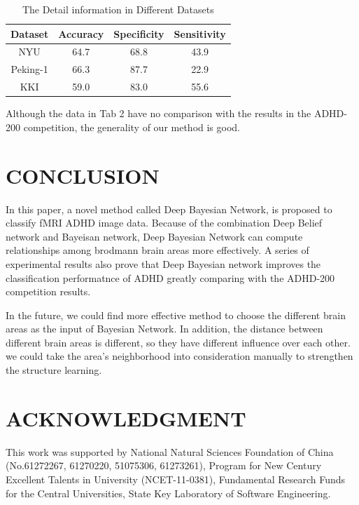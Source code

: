 \documentclass[10pt,twocolumn,letterpaper]{article}
\begin{document}
\begin{table}[h]
\label{tab:2}
\caption{The Detail information in Different Datasets}
\begin{center}
\begin{tabular}{cccc}
\hline

Dataset  	&   Accuracy  	&	Specificity  &	Sensitivity \\
\hline
NYU			&  64.7	&  68.8 & 43.9 \\[2pt]
Peking-1		& 66.3 & 87.7 &22.9\\[2pt]
KKI			& 59.0  & 83.0  & 55.6\\[2pt]
\hline
\end{tabular}
\end{center}
\end{table}


Although the data in Tab 2 have no comparison with the results in the ADHD-200 competition, the generality of our method is good.




\section{CONCLUSION}
In this paper, a novel method called Deep Bayesian Network, is proposed to classify fMRI ADHD image data. Because of the combination Deep Belief network and Bayeisan network, Deep Bayesian Network can compute relationships among brodmann brain areas more effectively. A series of experimental results also prove that Deep Bayesian network  improves the classification performatnce of ADHD greatly comparing with the ADHD-200 competition results. 


In the future, we could find more effective method to choose the different brain areas as the input of Bayesian Network. In addition, the distance between different brain areas is different, so they have different influence over each other. we could take  the area's neighborhood into consideration manually to strengthen the structure learning.



\section{ACKNOWLEDGMENT}

This work was supported by National Natural Sciences
Foundation of China (No.61272267, 61270220, 51075306,
61273261), Program for New Century Excellent Talents in
University (NCET-11-0381), Fundamental Research Funds for
the Central Universities, State Key Laboratory of Software
Engineering.

{\small


}
\end{document}
